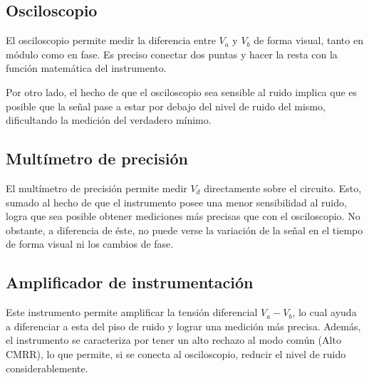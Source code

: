 \subsection{Osciloscopio}
El osciloscopio permite medir la diferencia entre $V_a$ y $V_b$ de forma visual, tanto en módulo como en fase. Es preciso conectar dos puntas y hacer la resta con la función matemática del instrumento. 

Por otro lado, el hecho de que el osciloscopio sea sensible al ruido implica que es posible que la señal pase a estar por debajo del nivel de ruido del mismo, dificultando la medición del verdadero mínimo.

\subsection{Multímetro de precisión}
El multímetro de precisión permite medir $V_d$ directamente sobre el circuito. Esto, sumado al hecho de que el instrumento posee una menor sensibilidad al ruido, logra que sea posible obtener mediciones más precisas que con el osciloscopio. No obstante, a diferencia de éste, no puede verse la variación de la señal en el tiempo de forma visual ni los cambios de fase.

\subsection{Amplificador de instrumentación}
Este instrumento permite amplificar la tensión diferencial $V_a-V_b$, lo cual ayuda a diferenciar a esta del piso de ruido y lograr una medición más precisa. Además, el instrumento se caracteriza por tener un alto rechazo al modo común (Alto CMRR), lo que permite, si se conecta al osciloscopio, reducir el nivel de ruido considerablemente.

